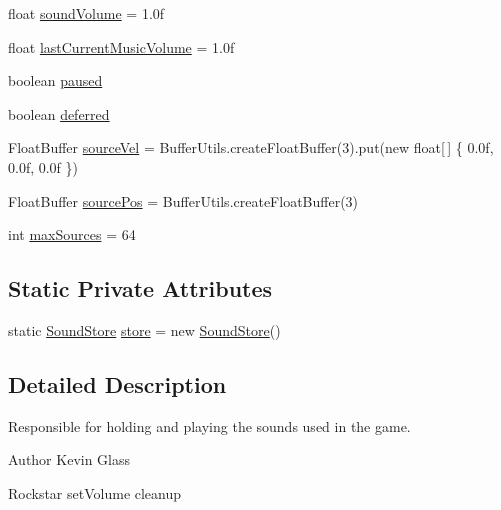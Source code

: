 \begin{DoxyCompactItemize}
float \mbox{\hyperlink{classorg_1_1newdawn_1_1slick_1_1openal_1_1_sound_store_af4d5ad2dc31f33a212d52ff54fcfe4fd}{sound\+Volume}} = 1.\+0f
\item 
float \mbox{\hyperlink{classorg_1_1newdawn_1_1slick_1_1openal_1_1_sound_store_a2e3c5e8604fb9229621276c4d1ea1ffd}{last\+Current\+Music\+Volume}} = 1.\+0f
\item 
boolean \mbox{\hyperlink{classorg_1_1newdawn_1_1slick_1_1openal_1_1_sound_store_a44c472fda007e17b19478fc3d77e04e3}{paused}}
\item 
boolean \mbox{\hyperlink{classorg_1_1newdawn_1_1slick_1_1openal_1_1_sound_store_a19c18b8305a40c99b51cde881a6f1d32}{deferred}}
\item 
Float\+Buffer \mbox{\hyperlink{classorg_1_1newdawn_1_1slick_1_1openal_1_1_sound_store_a7d543ecdbc1e6a438cbfd7f17a13934d}{source\+Vel}} = Buffer\+Utils.\+create\+Float\+Buffer(3).put(new float\mbox{[}$\,$\mbox{]} \{ 0.\+0f, 0.\+0f, 0.\+0f \})
\item 
Float\+Buffer \mbox{\hyperlink{classorg_1_1newdawn_1_1slick_1_1openal_1_1_sound_store_abda2a7825cab915991120a3635054864}{source\+Pos}} = Buffer\+Utils.\+create\+Float\+Buffer(3)
\item 
int \mbox{\hyperlink{classorg_1_1newdawn_1_1slick_1_1openal_1_1_sound_store_aca87e8efd1175fdb1f3158abf737b5e7}{max\+Sources}} = 64
\end{DoxyCompactItemize}
\subsection*{Static Private Attributes}
\begin{DoxyCompactItemize}
\item 
static \mbox{\hyperlink{classorg_1_1newdawn_1_1slick_1_1openal_1_1_sound_store}{Sound\+Store}} \mbox{\hyperlink{classorg_1_1newdawn_1_1slick_1_1openal_1_1_sound_store_ac83a0d0311e4d9018f032c8774ea4120}{store}} = new \mbox{\hyperlink{classorg_1_1newdawn_1_1slick_1_1openal_1_1_sound_store}{Sound\+Store}}()
\end{DoxyCompactItemize}


\subsection{Detailed Description}
Responsible for holding and playing the sounds used in the game.

\begin{DoxyAuthor}{Author}
Kevin Glass 

Rockstar set\+Volume cleanup 
\end{DoxyAuthor}


